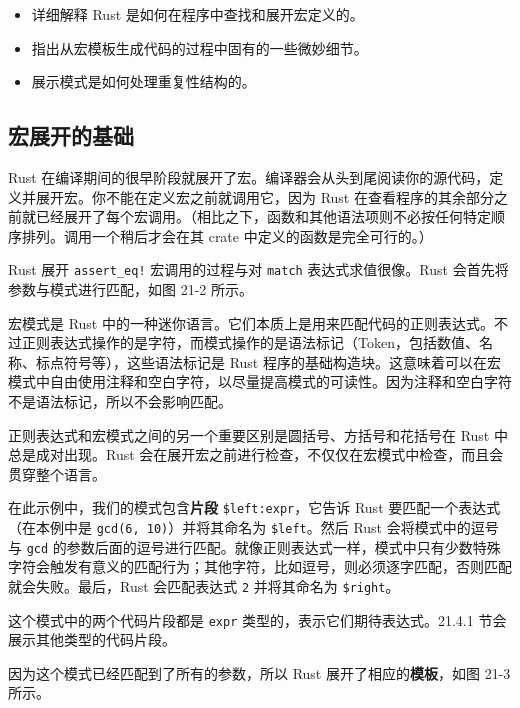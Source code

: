 \begin{itemize}
\item 详细解释 Rust 是如何在程序中查找和展开宏定义的。
\item 指出从宏模板生成代码的过程中固有的一些微妙细节。
\item 展示模式是如何处理重复性结构的。
\end{itemize}

\subsection{宏展开的基础}

Rust 在编译期间的很早阶段就展开了宏。编译器会从头到尾阅读你的源代码，定义并展开宏。你不能在定义宏之前就调用它，因为 Rust 在查看程序的其余部分之前就已经展开了每个宏调用。（相比之下，函数和其他语法项则不必按任何特定顺序排列。调用一个稍后才会在其 crate 中定义的函数是完全可行的。）

Rust 展开 \texttt{assert\_eq!} 宏调用的过程与对 \texttt{match} 表达式求值很像。Rust 会首先将参数与模式进行匹配，如图 21-2 所示。


宏模式是 Rust 中的一种迷你语言。它们本质上是用来匹配代码的正则表达式。不过正则表达式操作的是字符，而模式操作的是语法标记（Token，包括数值、名称、标点符号等），这些语法标记是 Rust 程序的基础构造块。这意味着可以在宏模式中自由使用注释和空白字符，以尽量提高模式的可读性。因为注释和空白字符不是语法标记，所以不会影响匹配。

正则表达式和宏模式之间的另一个重要区别是圆括号、方括号和花括号在 Rust 中总是成对出现。Rust 会在展开宏之前进行检查，不仅仅在宏模式中检查，而且会贯穿整个语言。

在此示例中，我们的模式包含\textbf{片段} \texttt{\$left:expr}，它告诉 Rust 要匹配一个表达式（在本例中是 \texttt{gcd(6, 10)}）并将其命名为 \texttt{\$left}。然后 Rust 会将模式中的逗号与 \texttt{gcd} 的参数后面的逗号进行匹配。就像正则表达式一样，模式中只有少数特殊字符会触发有意义的匹配行为；其他字符，比如逗号，则必须逐字匹配，否则匹配就会失败。最后，Rust 会匹配表达式 \texttt{2} 并将其命名为 \texttt{\$right}。

这个模式中的两个代码片段都是 \texttt{expr} 类型的，表示它们期待表达式。21.4.1 节会展示其他类型的代码片段。

因为这个模式已经匹配到了所有的参数，所以 Rust 展开了相应的\textbf{模板}，如图 21-3 所示。


